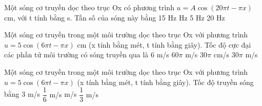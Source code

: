 \begin{vidu}%
Một sóng cơ truyền dọc theo trục Ox có phương trình $u = A\cos(20\pi t - \pi x)$ cm, với t tính bằng s. Tần số của sóng này bằng
\choice
{15 Hz}
{ Hz}
{5 Hz}
{20 Hz}
\end{vidu} %
\begin{vidu}%
Một sóng cơ truyền trong một môi trường dọc theo trục Ox với phương trình $u = 5\cos(6\pi t - \pi x)$ cm (x tính bằng mét, t tính bằng giây). Tốc độ cực đại các phần tử môi trường có sóng truyền qua là
\choice
{6 m/s}
{$60\pi$  m/s}
{\True $30\pi$  cm/s}
{$30\pi$  m/s}
\end{vidu} %


\begin{vidu}%
Một sóng cơ truyền trong một môi trường dọc theo trục Ox với phương trình $u=5\cos \left({6\pi t-\pi x}\right)$ (x tính bằng mét, t tính bằng giây). Tốc độ truyền sóng bằng
\choice
{3 m/s}
{$\dfrac{1}{6}$ m/s}
{ m/s}
{$\dfrac{1}{3}$ m/s}
\end{vidu} %

